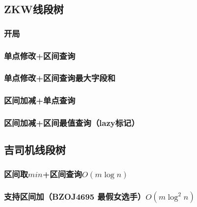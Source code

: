 \documentclass[twoside,a4paper]{article}
\begin{document}
\subsection{ZKW线段树}

\subsubsection{开局}


\subsubsection{单点修改+区间查询}


\subsubsection{单点修改+区间查询最大字段和}


\subsubsection{区间加减+单点查询}


\subsubsection{区间加减+区间最值查询（lazy标记）}



\subsection{吉司机线段树}

\subsubsection{区间取$min$+区间查询$O(m \log n)$}


\subsubsection{支持区间加（BZOJ4695 最假女选手）$O(m \log ^{2}n)$}

\end{document}
